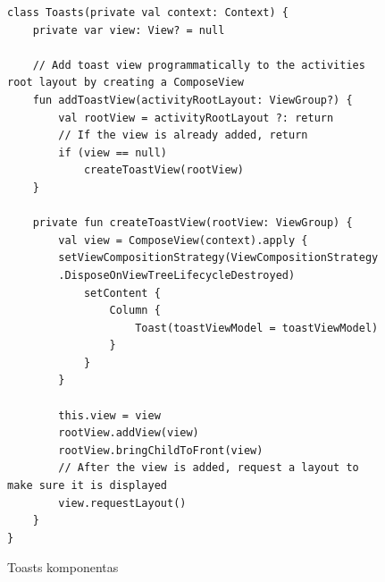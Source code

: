 \begin{figure}[htbp!]
    \centering
    \begin{verbatim}
class Toasts(private val context: Context) {
    private var view: View? = null

    // Add toast view programmatically to the activities root layout by creating a ComposeView
    fun addToastView(activityRootLayout: ViewGroup?) {
        val rootView = activityRootLayout ?: return
        // If the view is already added, return
        if (view == null)
            createToastView(rootView)
    }

    private fun createToastView(rootView: ViewGroup) {
        val view = ComposeView(context).apply {
        setViewCompositionStrategy(ViewCompositionStrategy
        .DisposeOnViewTreeLifecycleDestroyed)
            setContent {
                Column {
                    Toast(toastViewModel = toastViewModel)
                }
            }
        }

        this.view = view
        rootView.addView(view)
        rootView.bringChildToFront(view)
        // After the view is added, request a layout to make sure it is displayed
        view.requestLayout() 
    }
}
\end{verbatim}
    \caption{Toasts komponentas}
    \label{fig:Toasts}
\end{figure}